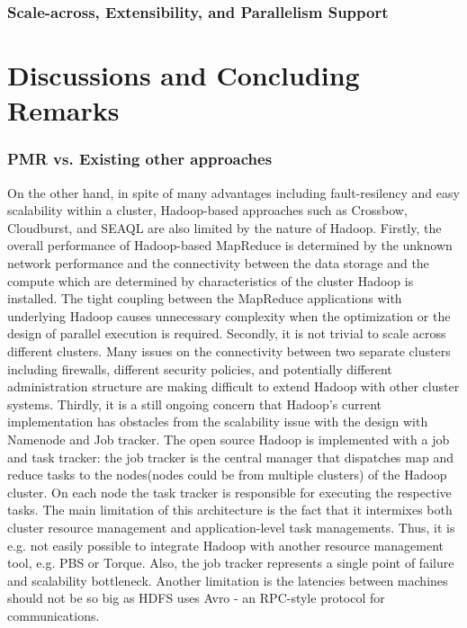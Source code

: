 \documentclass{sig-alternate}
\begin{document}
\subsubsection{Scale-across, Extensibility, and Parallelism Support}





\section{Discussions and Concluding Remarks}\label{sec:discussions}
\subsubsection{PMR vs. Existing other approaches}

On the other hand, in spite of many advantages including fault-resilency and easy scalability within a cluster, Hadoop-based approaches such as Crossbow, Cloudburst, and SEAQL are also limited by the nature of Hadoop.  Firstly, the overall performance of Hadoop-based MapReduce is determined by the unknown network performance and the connectivity between the data storage and the compute which are determined by characteristics of the cluster Hadoop is installed.  The tight coupling between the MapReduce applications with underlying Hadoop causes unnecessary complexity when the optimization or the design of parallel execution is required.  Secondly, it is not trivial to scale across different clusters.  Many issues on the connectivity between two separate clusters including firewalls, different security policies, and potentially different administration structure are making difficult to extend Hadoop with other cluster systems.  Thirdly, it is a still ongoing concern that Hadoop's current implementation has obstacles from the scalability issue with the design with Namenode and Job tracker.   The open source Hadoop is implemented with a job and task tracker: the job tracker is the central manager that dispatches map and reduce tasks to the nodes(nodes could be from multiple clusters) of the Hadoop cluster. On each node the task tracker is responsible for executing the respective tasks. The main limitation of this architecture is the fact that it intermixes both cluster resource management and application-level task managements. Thus, it is e.g. not easily possible to integrate Hadoop with another resource management tool, e.g. PBS or Torque. Also, the job tracker represents a single point of failure and scalability bottleneck. Another limitation is the latencies between machines should not be so big as HDFS uses Avro - an RPC-style protocol for communications.
\end{document}
